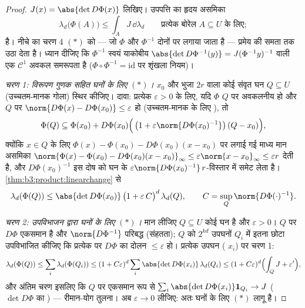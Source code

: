 \begin{proof}
$J(x) = \abs{\det D\Phi(x)}$ लिखिए। उपपत्ति का हृदय असमिका
\[
\lambda_d\bigl(\Phi(A)\bigr) \leq \int_A J\,\dd\lambda_d
\qquad\text{प्रत्येक बोरेल } A \subseteq U \text{ के लिए};
\tag{$*$}
\]
है। नीचे का चरण 4 $(*)$ को --- जो $\Phi$ और $\Phi^{-1}$ दोनों पर लगाया
जाता है --- प्रमेय की समता तक उठा देता है। ध्यान दीजिए कि $\Phi^{-1}$
स्वयं याकोबीय $\abs{\det D\Phi^{-1}(y)} = J(\Phi^{-1}y)^{-1}$ वाली एक $\mathcal C^1$ अवकल समरूपता है ($\Phi\circ\Phi^{-1} = \mathrm{id}$ पर
शृंखला नियम)।

\emph{चरण 1: विरूपण गुणक सहित घनों के लिए $(*)$।}  $x_0$ और
भुजा $2r$ वाला कोई संवृत घन $Q \subseteq U$ (उच्चतम-मानक गोला) स्थिर
कीजिए। दावा: प्रत्येक $\varepsilon > 0$ के लिए, यदि $\Phi$ $Q$ पर अवकलनीय हो
और $Q$ पर $\norm{D\Phi(x) - D\Phi(x_0)} \leq \varepsilon$ हो (उच्चतम-मानक के लिए ), तो
\[
\Phi(Q) \subseteq \Phi(x_0) + D\Phi(x_0)\Bigl(\,\bigl(1 +
\varepsilon\norm{D\Phi(x_0)^{-1}}\bigr)\,(Q - x_0)\Bigr),
\]
क्योंकि $x \in Q$ के लिए $\Phi(x) - \Phi(x_0) - D\Phi(x_0)(x - x_0)$ पर लगाई गई माध्य मान असमिका $\norm{\Phi(x) - \Phi(x_0) - D\Phi(x_0)(x-x_0)}_\infty \leq
\varepsilon\norm{x - x_0}_\infty \leq \varepsilon r$ देती
है, और $D\Phi(x_0)^{-1}$ इस दोष को घन के $\varepsilon\norm{D\Phi(x_0)^{-1}}\,r$-विस्तार में समेट लेता है।
\cref{thm:b3:product:linearchange} से
\[
\lambda_d(\Phi(Q)) \leq \abs{\det D\Phi(x_0)}\,
\bigl(1 + \varepsilon\,C\bigr)^{d}\,\lambda_d(Q),
\qquad C = \sup_{Q}\norm{D\Phi(\cdot)^{-1}} .
\]

\emph{चरण 2: उपविभाजन द्वारा  घनों के लिए $(*)$।} मान लीजिए
$Q
\subseteq U$ कोई  घन है और $\varepsilon > 0$। $Q$ पर $D\Phi$ एकसमान  है और
$\norm{D\Phi^{-1}}$ परिबद्ध (संहतता); $Q$ को $2^{kd}$ उपघनों $Q_i$ में इतना छोटा
उपविभाजित कीजिए कि प्रत्येक पर $D\Phi$ का दोलन $\leq \varepsilon$ हो। प्रत्येक
उपघन ( $x_i$) पर चरण 1:
\[
\lambda_d(\Phi(Q)) \leq \sum_i\lambda_d(\Phi(Q_i))
\leq (1 + C\varepsilon)^d \sum_i \abs{\det
D\Phi(x_i)}\,\lambda_d(Q_i)
\leq (1 + C\varepsilon)^d\Bigl(\int_Q J + \varepsilon'\Bigr),
\]
और अंतिम चरण इसलिए कि $Q$ पर एकसमान रूप से $\sum_i\abs{\det D\Phi(x_i)}\mathbf
1_{Q_i} \to J$ ($\det D\Phi$ का
) --- रीमान-योग तुलना। अब $\varepsilon \to 0$ लीजिए: अतः  घनों के लिए
$(*)$ लागू है।


\end{proof}
